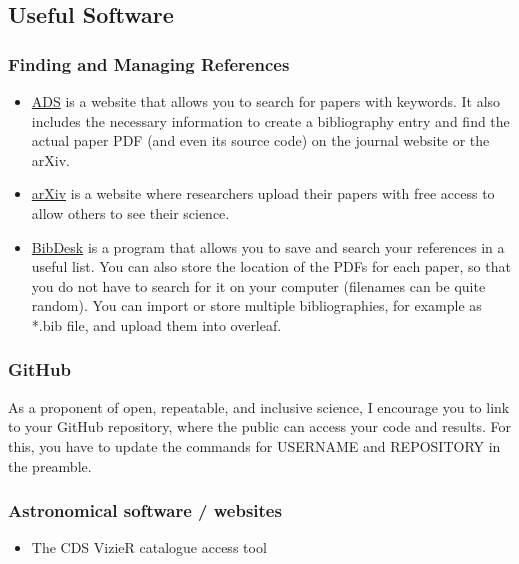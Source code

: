 \documentclass[fleqn,usenatbib]{mnras}
\newcommand{\githubusername}{USERNAME}
\newcommand{\githubrepository}{REPOSITORY}
\begin{document}
\subsection{Useful Software}

\subsubsection{Finding and Managing References}

\begin{itemize}
    \item \href{https://ui.adsabs.harvard.edu}{ADS} is a website that allows you to search for papers with keywords. It also includes the necessary information to create a bibliography entry and find the actual paper PDF (and even its source code) on the journal website or the arXiv.
    \item \href{https://arxiv.org}{arXiv} is a website where researchers upload their papers with free access to allow others to see their science.
    \item \href{https://bibdesk.sourceforge.io}{BibDesk} is a program that allows you to save and search your references in a useful list. You can also store the location of the PDFs for each paper, so that you do not have to search for it on your computer (filenames can be quite random). You can import or store multiple bibliographies, for example as *.bib file, and upload them into overleaf.
\end{itemize}

\subsubsection{GitHub}

As a proponent of open, repeatable, and inclusive science, I encourage you to link to your GitHub repository, where the public can access your code and results. For this, you have to update the commands for \githubusername\xspace and \githubrepository\xspace in the preamble.

\subsubsection{Astronomical software / websites}

\begin{itemize}
    \item The CDS VizieR catalogue access tool \citep{Vizier2000} 
\end{itemize}
\end{document}
